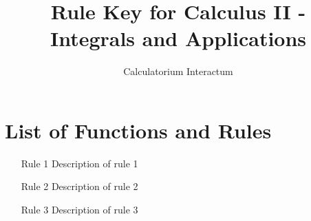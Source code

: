 \documentclass{article}
\title{Rule Key for Calculus II - Integrals and Applications}
\author{Calculatorium Interactum}
\begin{document}
\maketitle

\section{List of Functions and Rules}

\begin{enumerate}
    \item [Rule 1] Description of rule 1
    \item [Rule 2] Description of rule 2
    \item [Rule 3] Description of rule 3
\end{enumerate}
\end{document}

